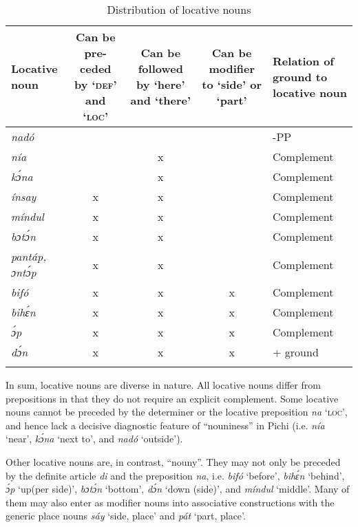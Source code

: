 \begin{table}
\caption{Distribution of locative nouns}
\label{tab:key:8.3}

\begin{tabularx}{\textwidth}{QCCCQ}
\lsptoprule
Locative noun &
  \raggedright Can be pre-ceded by  ‘\textsc{def’} and  ‘\textsc{loc’} & 
  \raggedright Can be followed by  ‘here’ and  ‘there’ & 
  \raggedright Can be modifier to  ‘side’ or  ‘part’ & Relation of ground to locative noun\\
\midrule 
\itshape nadó &  &  &  & -PP\\
\itshape nía &  & x &  & Complement\\
\itshape kɔ́na &  & x &  & Complement\\
\itshape ínsay & x & x &  & Complement\\
\itshape míndul & x & x &  & Complement\\
\itshape bɔtɔ́n & x & x &  & Complement\\
\itshape pantáp, ɔntɔ́p & x & x &  & Complement\\
\itshape bifó & x & x & x & Complement\\
\itshape bihɛ́n & x & x & x & Complement\\
\itshape ɔ́p & x & x & x & Complement\\
\itshape dɔ́n & x & x & x &  + ground\\
\lspbottomrule
\end{tabularx}
\end{table}
In sum, locative nouns are diverse in nature. All locative nouns differ from prepositions in that they do not require an explicit complement. Some locative nouns cannot be preceded by the determiner or the locative preposition \textit{na} ‘\textsc{loc}’, and hence lack a decisive diagnostic feature of “nouniness” in Pichi (i.e. \textit{nía} ‘near’, \textit{kɔ́na} ‘next to’, and \textit{nadó} ‘outside’). 


Other locative nouns are, in contrast, “nouny”. They may not only be preceded by the definite article \textit{di} and the preposition \textit{na}, i.e. \textit{bifó} ‘before’, \textit{bihɛ́n} ‘behind’, \textit{ɔ́p} ‘up(per side)’, \textit{bɔtɔ́n} ‘bottom’, \textit{dɔ́n} ‘down (side)’, and \textit{míndul} ‘middle’. Many of them may also enter as modifier nouns into associative constructions with the generic place nouns \textit{sáy} ‘side, place’ and \textit{pát} ‘part, place’.{\fff} 




